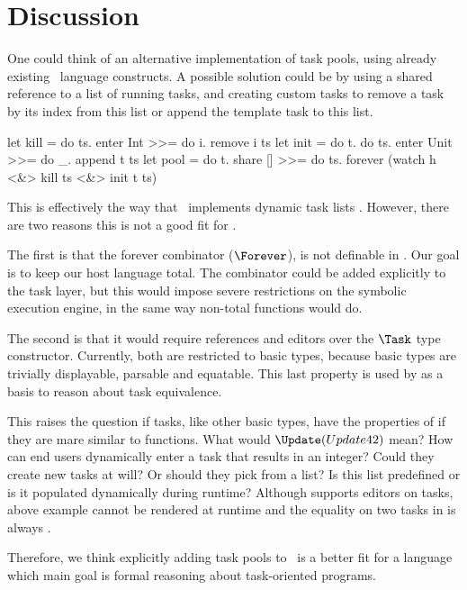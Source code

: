 
\section{Discussion}


One could think of an alternative implementation of task pools,
using already existing \TOPHAT\ language constructs.
A possible solution could be by using a shared reference to a list of running tasks,
and creating custom tasks to remove a task by its index from this list
or append the template task to this list.
\begin{TASK}
  let kill = do ts. enter Int >>= do i. remove i ts
  let init = do t. do ts. enter Unit >>= do _. append t ts
  let pool = do t.
    share [] >>= do ts.
    forever (watch h <&> kill ts <&> init t ts)
\end{TASK}

This is effectively the way that \ITASKS\ implements dynamic task lists \cite{conf/pepm/PlasmeijerAKLNG11}.
However, there are two reasons this is not a good fit for \TOPHAT.

The first is that the forever combinator ($\Forever$), is not definable in \TOPHAT.
Our goal is to keep our host language total.
The combinator could be added explicitly to the task layer,
but this would impose severe restrictions on the symbolic execution engine,
in the same way non-total functions would do.

The second is that it would require references and editors over the $\Task$ type constructor.
Currently, both are restricted to basic types,
because basic types are trivially displayable, parsable and equatable.
This last property is used by \cite{Klijnsma2020} as a basis to reason about task equivalence.

This raises the question if tasks, like other basic types, have the properties of if they are mare similar to functions.
What would $\Update (Update 42)$ mean?
How can end users dynamically enter a task that results in an integer?
Could they create new tasks at will?
Or should they pick from a list?
Is this list predefined or is it populated dynamically during runtime?
Although \ITASKS supports editors on tasks,
above example cannot be rendered at runtime and the equality on two tasks in \ITASKS is always .

Therefore, we think explicitly adding task pools to \TOPHAT\ is a better fit for a language which main goal is formal reasoning about task-oriented programs.

